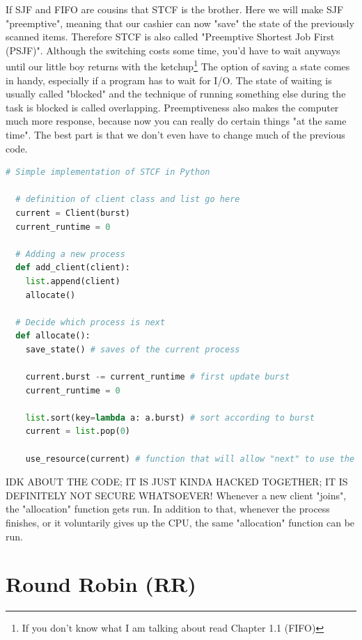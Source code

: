 \documentclass{report}
\newcounter{defi}[section]\setcounter{defi}{0}
\begin{document}
If SJF and FIFO are cousins that STCF is the brother.
Here we will make SJF "preemptive", meaning that our cashier can now "save" the state of the previously scanned items. 
Therefore STCF is also called "Preemptive Shortest Job First (PSJF)".
Although the switching costs some time, you'd have to wait anyways until our little boy returns with the ketchup\footnote{If you don't know what I am talking about read Chapter 1.1 (FIFO)}
The option of saving a state comes in handy, especially if a program has to wait for I/O.
The state of waiting is usually called "blocked" and the technique of running something else during the task is blocked is called overlapping.
Preemptiveness also makes the computer much more response, because now you can really do certain things "at the same time".
The best part is that we don't even have to change much of the previous code.
\pagebreak
\begin{lstlisting}[language=Python, style=colorEX]
  # Simple implementation of STCF in Python
  
  # definition of client class and list go here
  current = Client(burst)
  current_runtime = 0
  
  # Adding a new process
  def add_client(client): 
    list.append(client)
    allocate()
  
  # Decide which process is next
  def allocate():
    save_state() # saves of the current process

    current.burst -= current_runtime # first update burst
    current_runtime = 0

    list.sort(key=lambda a: a.burst) # sort according to burst
    current = list.pop(0)

    use_resource(current) # function that will allow "next" to use the CPU (also tracks runtime)
\end{lstlisting}
IDK ABOUT THE CODE; IT IS JUST KINDA HACKED TOGETHER; IT IS DEFINITELY NOT SECURE WHATSOEVER! 
Whenever a new client "joins", the "allocation" function gets run.
In addition to that, whenever the process finishes, or it voluntarily gives up the CPU, the same "allocation" function can be run.


\section{Round Robin (RR)}
\end{document}
